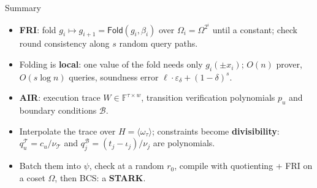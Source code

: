 \documentclass{zkdl-presentation-template}
\begin{document}
    \begin{frame}{Summary}
        \begin{itemize}
            \item \textbf{FRI}: fold $g_i \mapsto g_{i+1} = \mathsf{Fold}(g_i, \beta_i)$ over $\Omega_i = \Omega^{2^i}$ until a constant; check round consistency along $s$ random query paths.\pause
            \item Folding is \textbf{local}: one value of the fold needs only $g_i(\pm x_i)$; $O(n)$ prover, $O(s \log n)$ queries, soundness error $\ell \cdot \varepsilon_\delta + (1 - \delta)^s$.\pause
            \item \textbf{AIR}: execution trace $W \in \mathbb{F}^{\tau \times w}$, transition verification polynomials $p_u$ and boundary conditions $\mathcal{B}$.\pause
            \item Interpolate the trace over $H = \langle \omega_\tau \rangle$; constraints become \textbf{divisibility}: $q^{\mathcal{T}}_u = c_u / \nu_{\mathcal{T}}$ and $q^{\mathcal{B}}_j = (t_j - \iota_j)/\nu_j$ are polynomials.\pause
            \item Batch them into $\psi$, check at a random $r_0$, compile with quotienting + FRI on a coset $\Omega$, then BCS: a \textbf{STARK}.
        \end{itemize}
    \end{frame}

    \makeclosingframe
\end{document}
